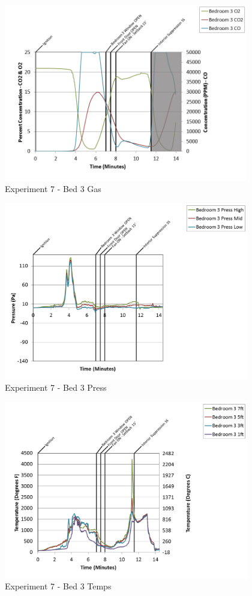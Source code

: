 \documentclass{article}
\begin{document}
\begin{appendices}
\clearpage

\begin{figure}[h!]
	\centering
	\includegraphics[height=3.05in]{0_Images/Results_Charts/Exp_7_Charts/Bed3Gas.png}
	\caption{Experiment 7 - Bed 3 Gas}
\end{figure}


\begin{figure}[h!]
	\centering
	\includegraphics[height=3.05in]{0_Images/Results_Charts/Exp_7_Charts/Bed3Press.png}
	\caption{Experiment 7 - Bed 3 Press}
\end{figure}

\clearpage

\begin{figure}[h!]
	\centering
	\includegraphics[height=3.05in]{0_Images/Results_Charts/Exp_7_Charts/Bed3Temps.png}
	\caption{Experiment 7 - Bed 3 Temps}
\end{figure}



\end{appendices}
\end{document}
